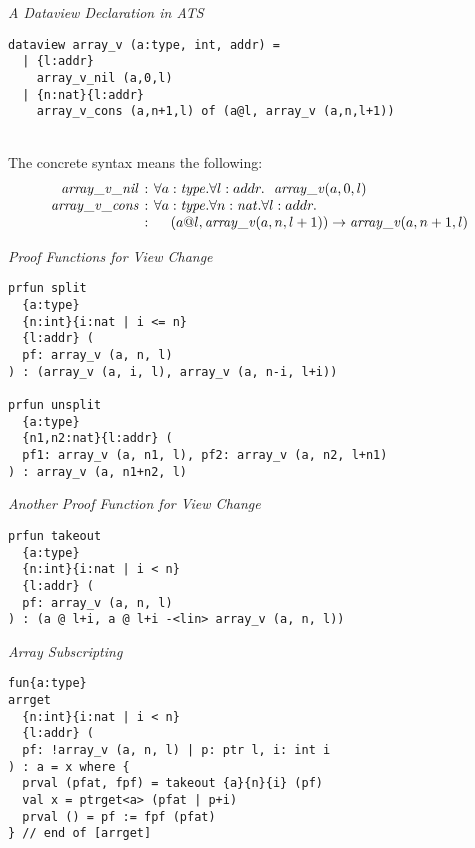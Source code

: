 \documentclass[pdf]{prosper}
\begin{document}
\begin{slide}{\em A Dataview Declaration in ATS}
{\blue\begin{verbatim}
dataview array_v (a:type, int, addr) =
  | {l:addr}
    array_v_nil (a,0,l)
  | {n:nat}{l:addr}
    array_v_cons (a,n+1,l) of (a@l, array_v (a,n,l+1))
\end{verbatim}}~\\
The concrete syntax means the following:
\[\begin{array}{rcl}
\cArrayNil  &\kern-6pt:\kern-6pt& \forall a:\stype.\forall l:addr.~~\varrayView(a,0,l) \\
\cArrayCons &\kern-6pt:\kern-6pt& \forall a:\stype.\forall n:\snat.\forall l:addr. \\
            &\kern-6pt:\kern-6pt& \kern12pt (a@l, \varrayView(a,n,l+1))\timp\varrayView(a,n+1,l) \\
\end{array}\]
\end{slide}
\begin{slide}{\em Proof Functions for View Change}
{\blue\begin{verbatim}
prfun split
  {a:type}
  {n:int}{i:nat | i <= n}
  {l:addr} (
  pf: array_v (a, n, l)
) : (array_v (a, i, l), array_v (a, n-i, l+i))

prfun unsplit
  {a:type}
  {n1,n2:nat}{l:addr} (
  pf1: array_v (a, n1, l), pf2: array_v (a, n2, l+n1)
) : array_v (a, n1+n2, l)
\end{verbatim}
}
\end{slide}
\begin{slide}{\em Another Proof Function for View Change}
{\blue\begin{verbatim}
prfun takeout
  {a:type}
  {n:int}{i:nat | i < n}
  {l:addr} (
  pf: array_v (a, n, l)
) : (a @ l+i, a @ l+i -<lin> array_v (a, n, l))
\end{verbatim}
}
\end{slide}
\begin{slide}{\em Array Subscripting}
{\blue\begin{verbatim}
fun{a:type}
arrget
  {n:int}{i:nat | i < n}
  {l:addr} (
  pf: !array_v (a, n, l) | p: ptr l, i: int i
) : a = x where {
  prval (pfat, fpf) = takeout {a}{n}{i} (pf)
  val x = ptrget<a> (pfat | p+i)
  prval () = pf := fpf (pfat)
} // end of [arrget]
\end{verbatim}
}
\end{slide}
\end{document}
